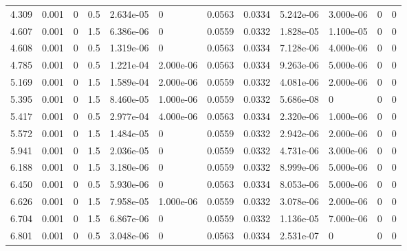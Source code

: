 \documentclass[preview]{standalone}
\begin{document}
{{\begin{tabular}{L{1.2cm}C{1.2cm} C{0.3cm}C{0.5cm} C{1.4cm}C{1.4cm} C{1.4cm}C{1.4cm} C{1.6cm}C{1.6cm} C{1.6cm}C{1.6cm}}
  4.309  &  0.001  & 0     & 0.5 &  2.634e-05  & 0  &  0.0563&   0.0334& 5.242e-06 & 3.000e-06   &  0 & 0  \\ 
  4.607  &  0.001  & 0     & 1.5 &  6.386e-06  & 0  &  0.0559&   0.0332& 1.828e-05 & 1.100e-05   &  0 & 0  \\ 
  4.608  &  0.001  & 0     & 0.5 &  1.319e-06  & 0  &  0.0563&   0.0334& 7.128e-06 & 4.000e-06   &  0 & 0  \\ 
  4.785  &  0.001  & 0     & 0.5 &  1.221e-04  & 2.000e-06  &  0.0563&   0.0334& 9.263e-06 & 5.000e-06   &  0 & 0  \\ 
  5.169  &  0.001  & 0     & 1.5 &  1.589e-04  & 2.000e-06  &  0.0559&   0.0332& 4.081e-06 & 2.000e-06   &  0 & 0  \\ 
  5.395  &  0.001  & 0     & 1.5 &  8.460e-05  & 1.000e-06  &  0.0559&   0.0332& 5.686e-08 & 0   &  0 & 0  \\ 
  5.417  &  0.001  & 0     & 0.5 &  2.977e-04  & 4.000e-06  &  0.0563&   0.0334& 2.320e-06 & 1.000e-06   &  0 & 0  \\ 
  5.572  &  0.001  & 0     & 1.5 &  1.484e-05  & 0  &  0.0559&   0.0332& 2.942e-06 & 2.000e-06   &  0 & 0  \\ 
  5.941  &  0.001  & 0     & 1.5 &  2.036e-05  & 0  &  0.0559&   0.0332& 4.731e-06 & 3.000e-06   &  0 & 0  \\ 
  6.188  &  0.001  & 0     & 1.5 &  3.180e-06  & 0  &  0.0559&   0.0332& 8.999e-06 & 5.000e-06   &  0 & 0  \\ 
  6.450  &  0.001  & 0     & 0.5 &  5.930e-06  & 0  &  0.0563&   0.0334& 8.053e-06 & 5.000e-06   &  0 & 0  \\ 
  6.626  &  0.001  & 0     & 1.5 &  7.958e-05  & 1.000e-06  &  0.0559&   0.0332& 3.078e-06 & 2.000e-06   &  0 & 0  \\ 
  6.704  &  0.001  & 0     & 1.5 &  6.867e-06  & 0  &  0.0559&   0.0332& 1.136e-05 & 7.000e-06   &  0 & 0  \\ 
  6.801  &  0.001  & 0     & 0.5 &  3.048e-06  & 0  &  0.0563&   0.0334& 2.531e-07 & 0   &  0 & 0  \\ 
\hline 
\end{tabular} 

}}
\end{document}
